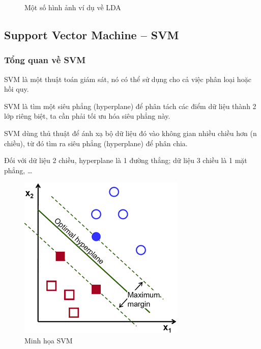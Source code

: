 \documentclass[a4paper, 12pt]{article}
\begin{document}
\begin{figure}[ht]
   \hfill	
  \caption{Một số hình ảnh ví dụ về LDA}
  \end{figure}
\clearpage

\subsection{Support Vector Machine – SVM}
\subsubsection{Tổng quan về SVM}
SVM là một thuật toán giám sát, nó có thể sử dụng cho cả việc phân loại hoặc hồi quy.

SVM là tìm một siêu phẳng (hyperplane) để phân tách các điểm dữ liệu thành 2 lớp riêng biệt, ta cần phải tối ưu hóa siêu phẳng này.

SVM dùng thủ thuật để ánh xạ bộ dữ liệu đó vào không gian nhiều chiều hơn (n chiều), từ đó tìm ra siêu phẳng (hyperplane) để phân chia.

Đối với dữ liệu 2 chiều, hyperplane là 1 đường thẳng; dữ liệu 3 chiều là 1 mặt phẳng, \dots

\begin{figure}[H]
    \begin{center}
        \includegraphics[scale=0.3]{img/SVM-ex-1.png}
        \caption{Minh họa SVM}
    \end{center}
\end{figure}
\end{document}
